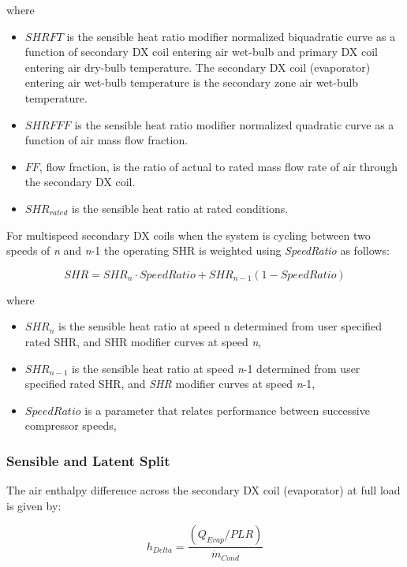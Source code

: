 where

\begin{itemize}
\tightlist
\item
  \(SHRFT\) is the sensible heat ratio modifier normalized biquadratic curve as a function of secondary DX coil entering air wet-bulb and primary DX coil entering air dry-bulb temperature. The secondary DX coil (evaporator) entering air wet-bulb temperature is the secondary zone air wet-bulb temperature.
\item
  \(SHRFFF\) is the sensible heat ratio modifier normalized quadratic curve as a function of air mass flow fraction. 
\item
  \(FF\), flow fraction,  is the ratio of actual to rated mass flow rate of air through the secondary DX coil.
\item
  \(SHR_{rated}\) is the sensible heat ratio at rated conditions.
\end{itemize}

For multispeed secondary DX coils when the system is cycling between two speeds of \emph{n} and \emph{n}-1 the operating SHR is weighted using \emph{SpeedRatio} as follows:

\begin{equation}
SHR = SHR_n \cdot SpeedRatio +  SHR_{n-1} (1 - SpeedRatio)
\end{equation}

where

\begin{itemize}
\tightlist
\item
  \(SHR_n\) is the sensible heat ratio at speed n determined from user specified rated SHR, and SHR modifier curves at speed \emph{n},
\item
  \(SHR_{n-1}\) is the sensible heat ratio at speed \emph{n}-1 determined from user specified rated SHR, and \emph{SHR} modifier curves at speed \emph{n}-1,
\item
  \(SpeedRatio\) is a parameter that relates performance between successive compressor speeds,
\end{itemize}

\subsubsection{Sensible and Latent Split}\label{sensible-and-latent-split}

The air enthalpy difference across the secondary DX coil (evaporator) at full load is given by:

\begin{equation}
  h_{Delta} = \frac{\left(Q_{Evap}/PLR\right)}{\dot{m}_{Cond}}
\end{equation}

